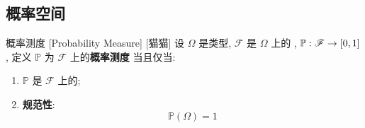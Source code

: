\documentclass[UTF8]{ctexart}
\begin{document}





    \subsection{概率空间}
        
        \begin{dfn}
            {概率测度}
            [Probability Measure]
            [猫猫]
            设 \(\Omega\) 是类型, \(\mathscr{F}\) 是 \(\Omega\) 上的 , \(\mathbb{P}:\mathscr{F}\to\Icc{0}{1}\), 定义 \(\mathbb{P}\) 为 \(\mathscr{F}\) 上的\textbf{概率测度} 当且仅当: 
            \begin{enumerate}
                \item \(\mathbb{P}\) 是 \(\mathscr{F}\) 上的; 
                \item \textbf{规范性}: 
                    \[\mathbb{P}(\Omega)=1\]
            \end{enumerate}
        \end{dfn}
\end{document}
